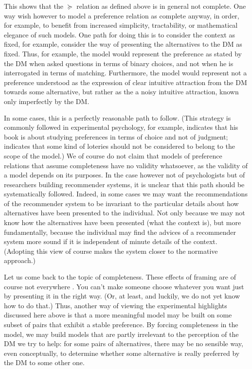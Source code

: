 \documentclass[french, english]{llncs}
\begin{document}
	This shows that the $\succeq$ relation as defined above is in general not complete. One way wish however to model a preference relation as complete anyway, in order, for example, to benefit from increased simplicity, tractability, or mathematical elegance of such models. One path for doing this is to consider the context as fixed, for example, consider the way of presenting the alternatives to the \ac{DM} as fixed. Thus, for example, the model would represent the preference as stated by the \ac{DM} when asked questions in terms of binary choices, and not when he is interrogated in terms of matching. Furthermore, the model would represent not a preference understood as the expression of clear intuitive attraction from the \ac{DM} towards some alternative, but rather as the a noisy intuitive attraction, known only imperfectly by the \ac{DM}. 
	
	In some cases, this is a perfectly reasonable path to follow. (This strategy is commonly followed in experimental psychology, for example, \citet{Luce} indicates that his book is about studying preferences in terms of choice and not of judgment; \citet{MacCrimmon} indicates that some kind of loteries should not be considered to belong to the scope of the model.) We of course do not claim that models of preference relations that assume completeness have no validity whatsoever, as the validity of a model depends on its purposes. In the case however not of psychologists but of researchers building recommender systems, it is unclear that this path should be systematically followed. Indeed, in some cases we may want the recommendations of the recommender system to be invariant to the particular details about how alternatives have been presented to the individual. Not only because we may not know how the alternatives have been presented (what the context is), but more fundamentally, because the individual may find the advices of a recommender system more sound if it is independent of minute details of the context. (Adopting this view of course makes the system closer to the normative approach.)
	
	Let us come back to the topic of completeness. These effects of framing are of course not everywhere \citep{slovic}. You can’t make someone choose whatever you want just by presenting it in the right way. (Or, at least, and luckily, we do not yet know how to do that.) Thus, another way of viewing the experimental highlights discussed here above is that a more meaningful model may be built on some subset of pairs that exhibit a stable preference. By forcing completeness in the model, we may build models that are partly irrelevant to the perception of the \ac{DM} we try to help: for some pairs of alternatives, there may be no sensible way, even conceptually, to determine whether some alternative is really preferred by the \ac{DM} to some other one.
	
\end{document}
